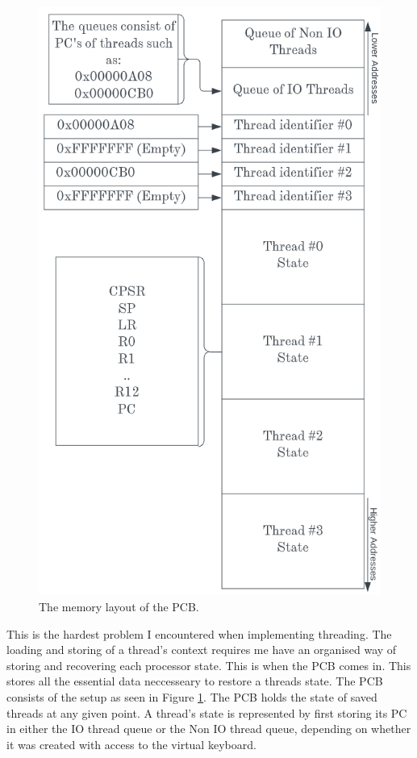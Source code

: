 \begin{figure}\centering
	\includegraphics[scale=0.335]{figures/PCB.png}
	\caption{The memory layout of the PCB.}
	\label{fig:PCB}
\end{figure} 
This is the hardest problem I encountered when implementing threading. The loading and storing of a thread's context requires me have an organised way of storing and recovering each processor state. This is when the PCB comes in. This stores all the essential data neccesseary to restore a threads state. The PCB consists of the setup as seen in  Figure \ref{fig:PCB}. The PCB holds the state of saved threads at any given point. A thread's state is represented by first storing its PC in either the IO thread queue or the Non IO thread queue, depending on whether it was created with access to the virtual keyboard.
